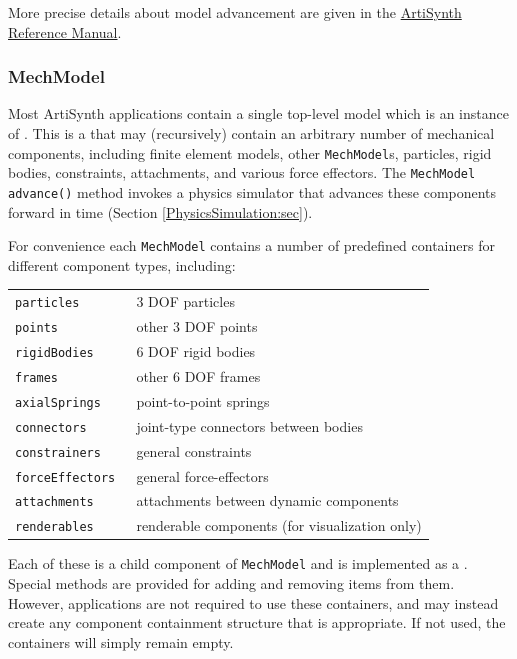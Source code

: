 More precise details about model advancement are given in the 
\href{../artisynth/artisynth.html}{
ArtiSynth Reference Manual}.

\subsubsection{MechModel}
\label{MechModel:sec}

Most ArtiSynth applications contain a single top-level model which is
an instance of .  This
is a  that may
(recursively) contain an arbitrary number of mechanical components,
including finite element models, other {\tt MechModel}s, particles,
rigid bodies, constraints, attachments, and various force effectors.
The {\tt MechModel} {\tt advance()} method invokes a physics simulator
that advances these components forward in time (Section
\ref{PhysicsSimulation:sec}).

For convenience each {\tt MechModel} contains a number of predefined
containers for different component types, including:

\begin{shadedregion}
\begin{tabular}{ll}
\tt particles & 3 DOF particles \\
\tt points & other 3 DOF points \\
\tt rigidBodies & 6 DOF rigid bodies \\
\tt frames & other 6 DOF frames \\
\tt axialSprings & point-to-point springs \\
\tt connectors & joint-type connectors between bodies \\
\tt constrainers & general constraints \\
\tt forceEffectors & general force-effectors \\
\tt attachments & attachments between dynamic components \\
\tt renderables & renderable components (for visualization only) \\
\end{tabular}
\end{shadedregion}
Each of these is a child component of {\tt MechModel} and is
implemented as a
. Special methods
are provided for adding and removing items from them. However,
applications are not required to use these containers, and may instead
create any component containment structure that is appropriate.
If not used, the containers will simply remain empty.

